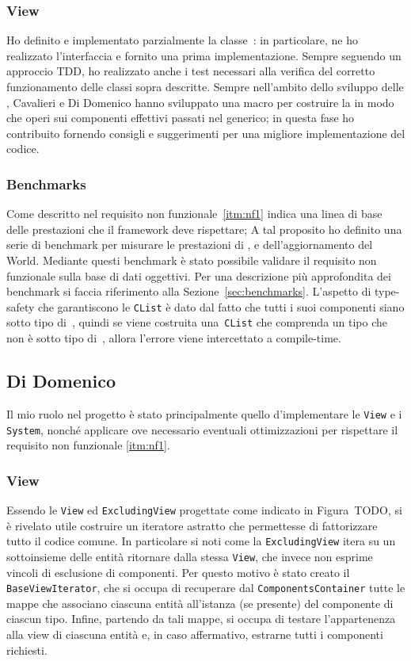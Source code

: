 \subsubsection{View}
Ho definito e implementato parzialmente la classe~\View: in particolare, ne ho realizzato l'interfaccia e fornito una
prima implementazione.
Sempre seguendo un approccio TDD, ho realizzato anche i test necessari alla verifica del corretto funzionamento delle
classi sopra descritte.
Sempre nell'ambito dello sviluppo delle \View, Cavalieri e Di Domenico hanno sviluppato una macro per costruire la
\View in modo che operi sui componenti effettivi passati nel generico;
in questa fase ho contribuito fornendo consigli e suggerimenti per una migliore implementazione del codice.

\subsubsection{Benchmarks}
Come descritto nel requisito non funzionale~\ref{itm:nf1} indica una linea di base delle prestazioni che il framework
deve rispettare;
A tal proposito ho definito una serie di benchmark per misurare le prestazioni di \View, \System e dell'aggiornamento
del World.
Mediante questi benchmark è stato possibile validare il requisito non funzionale sulla base di dati oggettivi.
Per una descrizione più approfondita dei benchmark si faccia riferimento alla Sezione~\ref{sec:benchmarks}.
L'aspetto di type-safety che garantiscono le \texttt{CList} è dato dal fatto che tutti i suoi componenti siano sotto tipo
di~\Component, quindi se viene costruita una~\texttt{CList} che comprenda un tipo che non è sotto tipo di~\Component,
allora l'errore viene intercettato a compile-time.

\subsection{Di Domenico}\label{subsec:nicolò-di-domenico}

Il mio ruolo nel progetto è stato principalmente quello d'implementare le \texttt{View} e i \texttt{System}, nonché
applicare ove necessario eventuali ottimizzazioni per rispettare il requisito non funzionale \ref{itm:nf1}.

\subsubsection{View}

Essendo le \texttt{View} ed \texttt{ExcludingView} progettate come indicato in Figura~TODO, si è rivelato utile costruire un
iteratore astratto che permettesse di fattorizzare tutto il codice comune.
In particolare si noti come la \texttt{ExcludingView} itera su un sottoinsieme delle entità ritornare dalla stessa
\texttt{View}, che invece non esprime vincoli di esclusione di componenti.
Per questo motivo è stato creato il \texttt{BaseViewIterator}, che si occupa di recuperare dal
\texttt{ComponentsContainer} tutte le mappe che associano ciascuna entità all'istanza (se presente) del componente di
ciascun tipo.
Infine, partendo da tali mappe, si occupa di testare l'appartenenza alla view di ciascuna entità e, in caso affermativo,
estrarne tutti i componenti richiesti.

